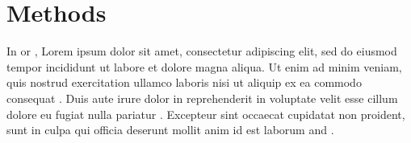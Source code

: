 \chapter{Methods}
\label{chap:methods}

In  or ,
Lorem ipsum dolor sit amet, consectetur adipiscing elit, sed do eiusmod tempor incididunt ut labore et dolore magna aliqua. Ut enim ad minim veniam, quis nostrud exercitation ullamco laboris nisi ut aliquip ex ea commodo consequat \textcite{ref1}. Duis aute irure dolor in reprehenderit in voluptate velit esse cillum dolore eu fugiat nulla pariatur \textcite{ref2}. Excepteur sint occaecat cupidatat non proident, sunt in culpa qui officia deserunt mollit anim id est laborum \textcite{ref3} and \textcite{ref4}.



